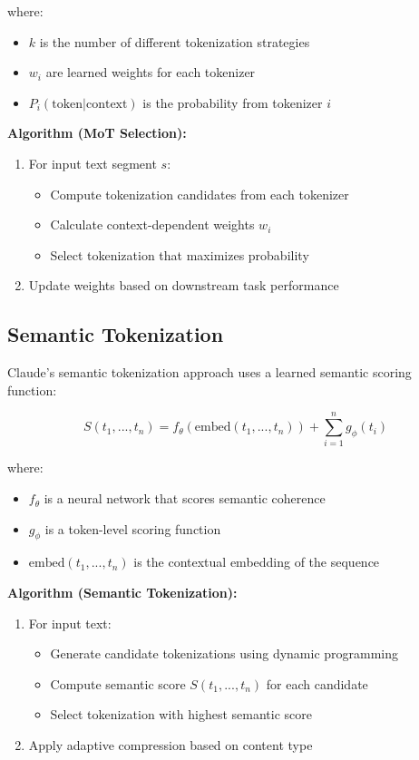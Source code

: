 \documentclass{article}
\begin{document}
where:
\begin{itemize}
\item $k$ is the number of different tokenization strategies
\item $w_i$ are learned weights for each tokenizer
\item $P_i(\text{token}|\text{context})$ is the probability from tokenizer $i$
\end{itemize}

\textbf{Algorithm (MoT Selection):}
\begin{enumerate}
\item For input text segment $s$:
   \begin{itemize}
   \item Compute tokenization candidates from each tokenizer
   \item Calculate context-dependent weights $w_i$
   \item Select tokenization that maximizes probability
   \end{itemize}
\item Update weights based on downstream task performance
\end{enumerate}

\subsection{Semantic Tokenization}
Claude's semantic tokenization approach uses a learned semantic scoring function:

\begin{equation*}
S(t_1, ..., t_n) = f_{\theta}(\text{embed}(t_1, ..., t_n)) + \sum_{i=1}^n g_{\phi}(t_i)
\end{equation*}

where:
\begin{itemize}
\item $f_{\theta}$ is a neural network that scores semantic coherence
\item $g_{\phi}$ is a token-level scoring function
\item $\text{embed}(t_1, ..., t_n)$ is the contextual embedding of the sequence
\end{itemize}

\textbf{Algorithm (Semantic Tokenization):}
\begin{enumerate}
\item For input text:
   \begin{itemize}
   \item Generate candidate tokenizations using dynamic programming
   \item Compute semantic score $S(t_1, ..., t_n)$ for each candidate
   \item Select tokenization with highest semantic score
   \end{itemize}
\item Apply adaptive compression based on content type
\end{enumerate}
\end{document}
